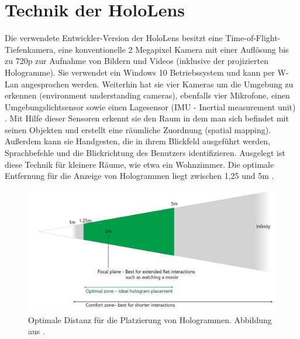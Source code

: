 \documentclass[conference, 11pt]{IEEEtran}
\begin{document}
\section{Technik der HoloLens}
Die verwendete Entwickler-Version der HoloLens besitzt eine Time-of-Flight-Tiefenkamera, eine konventionelle 2 Megapixel Kamera mit einer Auflösung bis zu 720p zur Aufnahme von Bildern und Videos (inklusive der projizierten Hologramme). Sie verwendet ein Windows 10 Betriebssystem und kann per W-Lan angesprochen werden. Weiterhin hat sie vier Kameras um die Umgebung zu erkennen (environment understanding cameras), ebenfalls vier Mikrofone, einen Umgebungslichtsensor sowie einen Lagesensor (IMU - Inertial measurement unit) \cite{Hardware}. Mit Hilfe dieser Sensoren erkennt sie den Raum in dem man sich befindet mit seinen Objekten und erstellt eine räumliche Zuordnung (spatial mapping). Außerdem kann sie Handgesten, die in ihrem Blickfeld ausgeführt werden, Sprachbefehle und die Blickrichtung des Benutzers identifizieren. Ausgelegt ist diese Technik für kleinere Räume, wie etwa ein Wohnzimmer. Die optimale Entfernung für die Anzeige von Hologrammen liegt zwischen 1,25 und 5m \cite{Stability}.\par

\begin{figure}[H]
	\centering
	\includegraphics[width=\columnwidth]{Comfortzone}
	\caption{Optimale Distanz für die Platzierung von Hologrammen. Abbildung aus \cite{Stability}.}
\end{figure}
\end{document}
